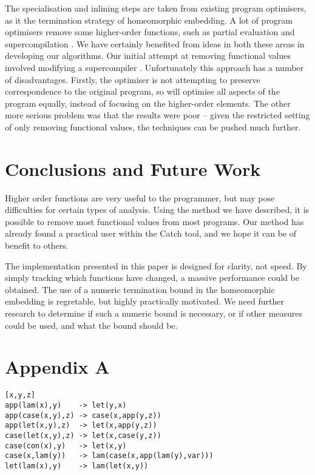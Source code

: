 \documentclass[preprint]{sigplanconf}
\begin{document}
The specialisation and inlining steps are taken from existing program optimisers, as it the termination strategy of homeomorphic embedding. A lot of program optimisers remove some higher-order functions, such as partial evaluation \cite{jones:partial_evaluation} and supercompilation \cite{supercompilation}. We have certainly benefited from ideas in both these areas in developing our algorithms. Our initial attempt at removing functional values involved modifying a supercompiler \cite{me:supero}. Unfortunately this approach has a number of disadvantages. Firstly, the optimiser is not attempting to preserve correspondence to the original program, so will optimise all aspects of the program equally, instead of focusing on the higher-order elements. The other more serious problem was that the results were poor -- given the restricted setting of only removing functional values, the techniques can be pushed much further.

\section{Conclusions and Future Work}

Higher order functions are very useful to the programmer, but may pose difficulties for certain types of analysis. Using the method we have described, it is possible to remove most functional values from most programs. Our method has already found a practical user within the Catch tool, and we hope it can be of benefit to others.

The implementation presented in this paper is designed for clarity, not speed. By simply tracking which functions have changed, a massive performance could be obtained. The use of a numeric termination bound in the homeomorphic embedding is regretable, but highly practically motivated. We need further research to determine if such a numeric bound is necessary, or if other measures could be used, and what the bound should be.

\section*{Appendix A}

\begin{verbatim}
[x,y,z]
app(lam(x),y)    -> let(y,x)
app(case(x,y),z) -> case(x,app(y,z))
app(let(x,y),z)  -> let(x,app(y,z))
case(let(x,y),z) -> let(x,case(y,z))
case(con(x),y)   -> let(x,y)
case(x,lam(y))   -> lam(case(x,app(lam(y),var)))
let(lam(x),y)    -> lam(let(x,y))
\end{verbatim}





\end{document}
